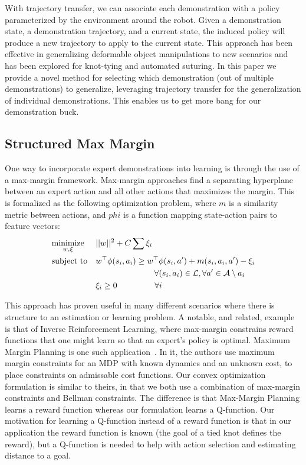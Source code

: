 With trajectory transfer, we can associate each demonstration with a policy parameterized by the environment around the robot.
Given a demonstration state, a demonstration trajectory, and a current state, the induced policy will produce a new trajectory to apply to the current state.
This approach has been effective in generalizing deformable object manipulations to new scenarios and has been explored for knot-tying and automated suturing.
In this paper we provide a novel method for selecting which demonstration (out of multiple demonstrations) to generalize,
leveraging trajectory transfer for the generalization of individual demonstrations.
This enables us to get more bang for our demonstration buck.

\subsection{Structured Max Margin}
One way to incorporate expert demonstrations into learning is through the use of a max-margin framework.
Max-margin approaches find a separating hyperplane between an expert action and all other actions that maximizes the margin.
This is formalized as the following optimization problem, where $m$ is a similarity metric between actions, and $phi$ is a function mapping state-action pairs to feature vectors:
\begin{equation}
\begin{aligned}
& \underset{w, \xi}{\text{minimize}}  & & ||w||^2 + C\sum \xi_i\\
& \text{subject to} & &w^\top \phi(s{}_i, a{}_i) \geq w^\top \phi(s{}_i, a{}') + m(s{}_i, a{}_i, a{}') - \xi_i 
\\&&&\hspace{2.5cm}\forall (s{}_i, a{}_i) \in \mathcal{L}{}, \forall a{}' \in \mathcal{A}{}\setminus a{}_i \\
& & &\xi_i \geq 0 \hspace{1.6cm} \forall i
\end{aligned}
\end{equation}

This approach has proven useful in many different scenarios where there is structure to an estimation or learning problem.
A notable, and related, example is that of Inverse Reinforcement Learning, where max-margin constrains reward functions that one might learn so that an expert's policy is optimal.
Maximum Margin Planning is one such application~\cite{Ratliff_ICML06}.
In it, the authors use maximum margin constraints for an MDP with known dynamics and an unknown cost, to place constraints on admissable cost functions.
Our convex optimization formulation is similar to theirs, in that we both use a combination of max-margin constraints and Bellman constraints.
The difference is that Max-Margin Planning learns a reward function whereas our formulation learns a Q-function.
Our motivation for learning a Q-function instead of a reward function is that in our application the reward function is known (the goal of a tied knot defines the reward), but a Q-function is needed to help with action selection and estimating distance to a goal.


